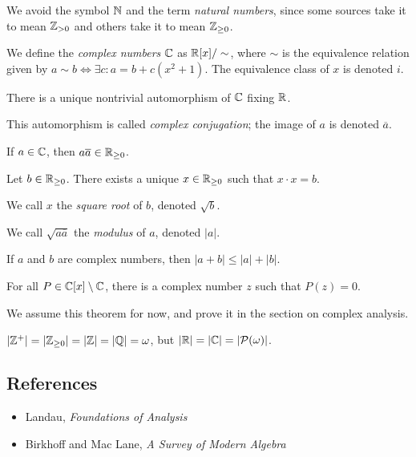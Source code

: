 \begin{rem}
    We avoid the symbol $\mathbb{N}$ and the term \emph{natural numbers},
    since some sources take it to mean $\mathbb{Z}_{>0}$ and others take it to mean
    $\mathbb{Z}_{\ge 0}$.
\end{rem}
\begin{defn}
    We define the \emph{complex numbers} $\mathbb{C}$ as $\mathbb{R}[x]/\sim$, where $\sim$
    is the equivalence relation given by $a\sim b\iff\exists c:a=b+c(x^2+1)$.
    The equivalence class of $x$ is denoted $i$.
\end{defn}
\begin{prop}
    There is a unique nontrivial automorphism of $\mathbb{C}$ fixing $\mathbb{R}$.
\end{prop}
\begin{defn}
    This automorphism is called \emph{complex conjugation}; the image of $a$
    is denoted $\overline a$.
\end{defn}
\begin{prop}
    If $a\in\mathbb{C}$, then $a\overline a\in\mathbb{R}_{\ge 0}$.
\end{prop}
\begin{prop}
    Let $b\in\mathbb{R}_{\ge 0}$. There exists a unique $x\in\mathbb{R}_{\ge 0}$ such that
    $x\cdot x=b$. 
\end{prop}
\begin{defn}
    We call $x$ the \emph{square root} of $b$, denoted $\sqrt b$.
\end{defn}
\begin{defn}
    We call $\sqrt{a\overline a}$ the \emph{modulus} of $a$, denoted $|a|$.
\end{defn}
\begin{prop}
    If $a$ and $b$ are complex numbers, then $|a+b|\le|a|+|b|$.
\end{prop}
\begin{thm}
      For all $P\in\mathbb{C}[x]\setminus\mathbb{C}$, there is a complex number $z$ such that
      $P(z)=0$.
\end{thm}
\begin{rem}
      We assume this theorem for now, and prove it in the section on complex
      analysis.
\end{rem}
\begin{thm}
    $|\mathbb{Z}^+|=|\mathbb{Z}_{\ge 0}|=|\mathbb{Z}|=|\mathbb{Q}|=\omega$, but $|\mathbb{R}|=|\mathbb{C}|=|\mathcal
    P(\omega)|$.
\end{thm}
\subsection*{References}
\begin{itemize}
    \item Landau, \emph{Foundations of Analysis}
    \item Birkhoff and Mac Lane, \emph{A Survey of Modern Algebra}
\end{itemize}
